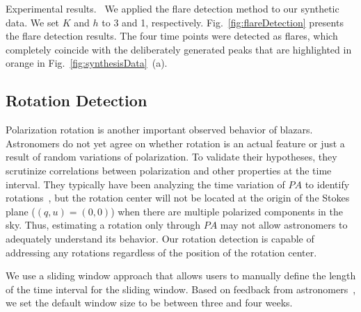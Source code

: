 \textsf{Experimental results.\ } We applied the flare detection method to our synthetic data.
We set $K$ and $h$ to 3 and 1, respectively.
Fig.~\ref{fig:flareDetection} presents the flare detection results.
The four time points were detected as flares,
which completely coincide with the deliberately generated peaks that are highlighted in orange in Fig.~\ref{fig:synthesisData}~(a).

\subsection{Rotation Detection}\label{sec:rotationDetection}
Polarization rotation is another important observed behavior of blazars. 
Astronomers do not yet agree on whether rotation is an actual feature or just a result of random variations of polarization.
To validate their hypotheses, they scrutinize correlations between polarization and other properties at the time interval.
They typically have been analyzing the time variation of $PA$ to identify rotations~\cite{Ikejiri2011, Uemura2017},
but the rotation center will not be located at the origin of the Stokes plane ($(q, u) = (0, 0)$) when there are multiple polarized components in the sky.
Thus, estimating a rotation only through $PA$ may not allow astronomers to adequately understand its behavior.
Our rotation detection is capable of addressing any rotations regardless of the position of the rotation center.

We use a sliding window approach that allows users to manually define the length of the time interval for the sliding window. Based on feedback from astronomers~\cite{Sasada2012}, we set the default window size to be between three and four weeks.


